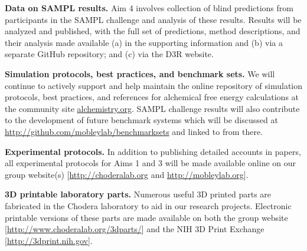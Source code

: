 \documentclass[11pt]{article}
\begin{document}
{\bf Data on SAMPL results.} Aim 4 involves collection of blind predictions from participants in the SAMPL challenge and analysis of these results. Results will be analyzed and published, with the full set of predictions, method descriptions, and their analysis made available (a) in the supporting information and (b) via a separate GitHub repository; and (c) via the D3R website. 

{\bf Simulation protocols, best practices, and benchmark sets.} We will continue to actively support and help maintain the online repository of simulation protocols, best practices, and references for alchemical free energy calculations at the community site \url{alchemistry.org}. SAMPL challenge results will also contribute to the development of future benchmark systems which will be discussed at \url{http://github.com/mobleylab/benchmarksets} and linked to from there.

{\bf Experimental protocols.} In addition to publishing detailed accounts in papers, all experimental protocols for Aims 1 and 3 will be made available online on our group website(s) [\url{http://choderalab.org} and \url{http://mobleylab.org}].

{\bf 3D printable laboratory parts.} Numerous useful 3D printed parts are fabricated in the Chodera laboratory to aid in our research projects. Electronic printable versions of these parts are made available on both the group website [\url{http://www.choderalab.org/3dparts/}] and the NIH 3D Print Exchange [\url{http://3dprint.nih.gov}].



\newpage

%
%


\end{document}
